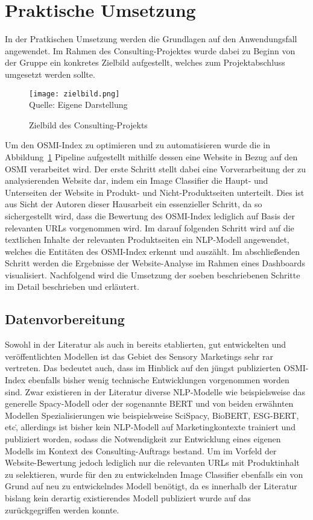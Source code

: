 \newpage

\section{Praktische Umsetzung} \label{Praktische Umsetzung}

In der Pratkischen Umsetzung werden die Grundlagen auf den Anwendungsfall angewendet.
Im Rahmen des Consulting-Projektes wurde dabei zu Beginn von der Gruppe ein konkretes Zielbild aufgestellt, welches zum
Projektabschluss umgesetzt werden sollte.

\begin{figure}[H]
	\caption{Zielbild des Consulting-Projekts}\label{fig:zielbild}
	\texttt{[image: zielbild.png]}
	\\
	Quelle: Eigene Darstellung
\end{figure}

Um den OSMI-Index zu optimieren und zu automatisieren wurde die in Abbildung~\ref{fig:zielbild} Pipeline aufgestellt mithilfe dessen
eine Website in Bezug auf den OSMI verarbeitet wird.
Der erste Schritt stellt dabei eine Vorverarbeitung der zu analysierenden Website dar, indem ein Image Classifier die Haupt- und Unterseiten der Website in
Produkt- und Nicht-Produktseiten unterteilt.
Dies ist aus Sicht der Autoren dieser Hausarbeit ein essenzieller Schritt, da so sichergestellt wird, dass die Bewertung des OSMI-Index lediglich auf Basis
der relevanten URLs vorgenommen wird.
Im darauf folgenden Schritt wird auf die textlichen Inhalte der relevanten Produktseiten ein \ac{NLP}-Modell angewendet, welches die Entitäten des OSMI-Index erkennt und auszählt.
Im abschließenden Schritt werden die Ergebnisse der Website-Analyse im Rahmen eines Dashboards visualisiert.
Nachfolgend wird die Umsetzung der soeben beschriebenen Schritte im Detail beschrieben und erläutert.

\subsection{Datenvorbereitung}

Sowohl in der Literatur als auch in bereits etablierten, gut entwickelten und veröffentlichten Modellen ist das Gebiet
des Sensory Marketings sehr rar vertreten.
Das bedeutet auch, dass im Hinblick auf den jüngst publizierten \ac{OSMI}-Index ebenfalls bisher wenig technische Entwicklungen
vorgenommen worden sind.
Zwar existieren in der Literatur diverse NLP-Modelle wie beispielsweise das generelle Spacy-Modell oder der sogenannte BERT
und von beiden erwähnten Modellen Spezialisierungen wie beispielsweise SciSpacy, BioBERT, ESG-BERT, etc\., allerdings ist
bisher kein NLP-Modell auf Marketingkontexte trainiert und publiziert worden, sodass die Notwendigkeit zur Entwicklung eines
eigenen Modells im Kontext des Consulting-Auftrags bestand.
Um im Vorfeld der Website-Bewertung jedoch lediglich nur die relevanten URLs mit Produktinhalt zu selektieren, wurde für den zu
entwickelnden Image Classifier ebenfalls ein von Grund auf neu zu entwickelndes Modell benötigt, da es innerhalb der Literatur
bislang kein derartig existierendes Modell publiziert wurde auf das zurückgegriffen werden konnte.

